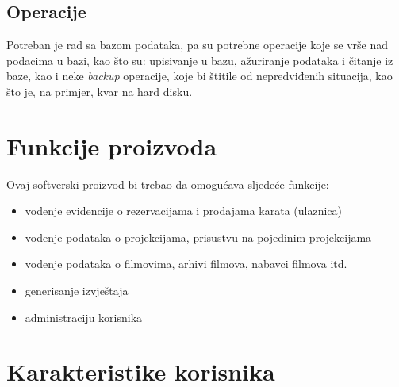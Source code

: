\subsection{Operacije}

Potreban je rad sa bazom podataka, pa su potrebne operacije
koje se vrše nad podacima u bazi, kao što su: upisivanje u bazu,
ažuriranje podataka i čitanje iz baze, kao i neke \textit{backup} operacije, koje bi
štitile od nepredviđenih situacija, kao što je, na primjer, kvar na hard disku.


\section{Funkcije proizvoda}

Ovaj softverski proizvod bi trebao da omogućava sljedeće funkcije:
\begin{itemize}
  \item vođenje evidencije o rezervacijama i prodajama karata (ulaznica)
  \item vođenje podataka o projekcijama, prisustvu na pojedinim projekcijama
  \item vođenje podataka o filmovima, arhivi filmova, nabavci filmova itd.
  \item generisanje  izvještaja
  \item administraciju korisnika  
\end{itemize}

\section{Karakteristike korisnika}

